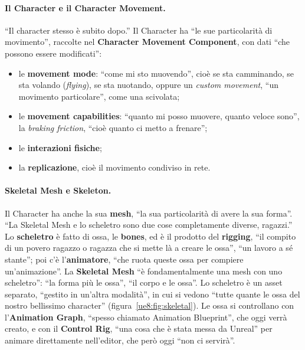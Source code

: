\paragraph{Il Character e il Character Movement.} ``Il character stesso è subito dopo.''
Il Character ha ``le sue particolarità di movimento'', raccolte nel \textbf{Character
Movement Component}, con dati ``che possono essere modificati'':
\begin{itemize}
  \item le \textbf{movement mode}: ``come mi sto muovendo'', cioè se sta camminando, se
        sta volando (\emph{flying}), se sta nuotando, oppure un \emph{custom movement},
        ``un movimento particolare'', come una scivolata;
  \item le \textbf{movement capabilities}: ``quanto mi posso muovere, quanto veloce
        sono'', la \emph{braking friction}, ``cioè quanto ci metto a frenare'';
  \item le \textbf{interazioni fisiche};
  \item la \textbf{replicazione}, cioè il movimento condiviso in rete.
\end{itemize}

\paragraph{Skeletal Mesh e Skeleton.} Il Character ha anche la sua \textbf{mesh}, ``la
sua particolarità di avere la sua forma''. ``La Skeletal Mesh e lo scheletro sono due
cose completamente diverse, ragazzi.'' Lo \textbf{scheletro} è fatto di ossa, le
\textbf{bones}, ed è il prodotto del \textbf{rigging}, ``il compito di un povero ragazzo
o ragazza che si mette là a creare le ossa'', ``un lavoro a sé stante''; poi c'è
l'\textbf{animatore}, ``che ruota queste ossa per compiere un'animazione''. La
\textbf{Skeletal Mesh} ``è fondamentalmente una mesh con uno scheletro'': ``la forma più
le ossa'', ``il corpo e le ossa''. Lo scheletro è un asset separato, ``gestito in
un'altra modalità'', in cui si vedono ``tutte quante le ossa del nostro bellissimo
character'' (figura~\ref{ue8:fig:skeletal}). Le ossa si controllano con
l'\textbf{Animation Graph}, ``spesso chiamato Animation Blueprint'', che oggi verrà
creato, e con il \textbf{Control Rig}, ``una cosa che è stata messa da Unreal'' per
animare direttamente nell'editor, che però oggi ``non ci servirà''.

